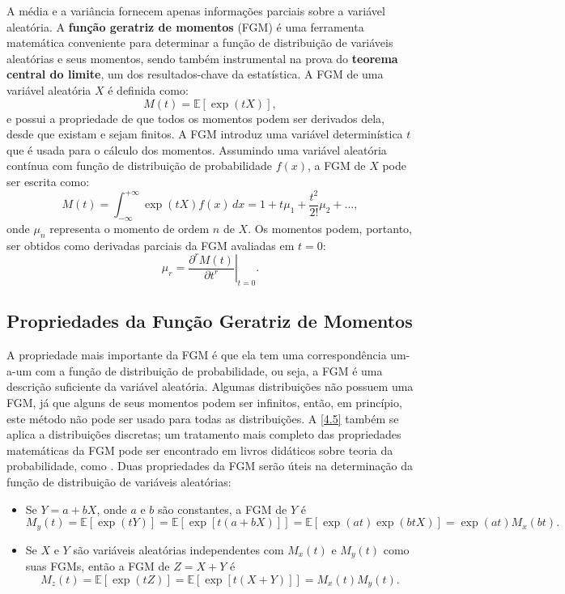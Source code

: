 A média e a variância fornecem apenas informações parciais sobre a variável aleatória. A \textbf{função geratriz de momentos} (FGM) é uma ferramenta matemática conveniente para determinar a função de distribuição de variáveis aleatórias e seus momentos, sendo também instrumental na prova do \textbf{teorema central do limite}, um dos resultados-chave da estatística. A FGM de uma variável aleatória $X$ é definida como:
\begin{equation}\label{4.4}
M(t) = \mathbb{E}[\exp{\left(tX\right)}],
\end{equation}
e possui a propriedade de que todos os momentos podem ser derivados dela, desde que existam e sejam finitos. A FGM introduz uma variável determinística $t$ que é usada para o cálculo dos momentos. Assumindo uma variável aleatória contínua com função de distribuição de probabilidade $ f(x) $, a FGM de $ X $ pode ser escrita como:
\begin{equation*}
M(t) = \int_{-\infty}^{+\infty} \exp{\left(tX\right)} f(x)\,dx = 1 + t\mu_1 + \dfrac{t^2}{2!}\mu_2 + \ldots,
\end{equation*}
onde $ \mu_n $ representa o momento de ordem $ n $ de $ X $. Os momentos podem, portanto, ser obtidos como derivadas parciais da FGM avaliadas em $ t = 0 $:
\begin{equation}\label{4.5}
\mu_r = \left. \dfrac{\partial^r M(t)}{\partial t^r} \right|_{t=0}.
\end{equation}

\subsection{Propriedades da Função Geratriz de Momentos}

A propriedade mais importante da FGM é que ela tem uma correspondência um-a-um com a função de distribuição de probabilidade, ou seja, a FGM é uma descrição suficiente da variável aleatória. Algumas distribuições não possuem uma FGM, já que alguns de seus momentos podem ser infinitos, então, em princípio, este método não pode ser usado para todas as distribuições. A \autoref{4.5} também se aplica a distribuições discretas; um tratamento mais completo das propriedades matemáticas da FGM pode ser encontrado em livros didáticos sobre teoria da probabilidade, como \citet{ross2019introduction}. Duas propriedades da FGM serão úteis na determinação da função de distribuição de variáveis aleatórias:
\begin{itemize}[noitemsep]
\item Se $Y = a + bX$, onde $a$ e $b$ são constantes, a FGM de $Y$ é
\begin{equation}
M_y(t) = \mathbb{E}[\exp(tY)] = \mathbb{E}[\exp[t(a + bX)]] = \mathbb{E}[\exp(at)\exp(btX)] = \exp(at) M_x(bt).
\end{equation}

\item Se $X$ e $Y$ são variáveis aleatórias independentes com $M_x(t)$ e $M_y(t)$ como suas FGMs, então a FGM de $Z = X + Y$ é
\begin{equation}
M_z(t) = \mathbb{E}[\exp(tZ)] = \mathbb{E}[\exp[t(X + Y)]] = M_x(t)M_y(t).
\end{equation}
\end{itemize}

